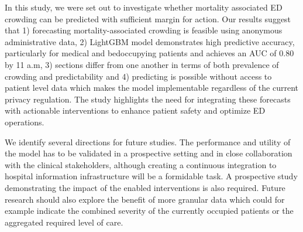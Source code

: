 In this study, we were set out to investigate whether mortality associated ED crowding can be predicted with sufficient margin for action. Our results suggest that 1) forecasting mortality-associated crowding is feasible using anonymous administrative data, 2) LightGBM model demonstrates high predictive accuracy, particularly for medical and bedoccupying patients and achieves an AUC of 0.80 by 11 a.m, 3) sections differ from one another in terms of both prevalence of crowding and predictability and 4) predicting is possible without access to patient level data which makes the model implementable regardless of the current privacy regulation. The study highlights the need for integrating these forecasts with actionable interventions to enhance patient safety and optimize ED operations. 

We identify several directions for future studies. The performance and utility of the model has to be validated in a prospective setting and in close collaboration with the clinical stakeholders, although creating a continuous integration to hospital information infrastructure will be a formidable task. A prospective study demonstrating the impact of the enabled interventions is also required. Future research should also explore the benefit of more granular data which could for example indicate the combined severity of the currently occupied patients or the aggregated required level of care.